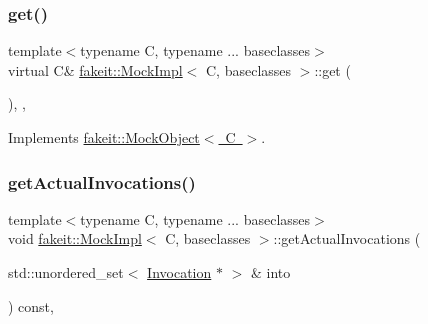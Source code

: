 \mbox{\label{classfakeit_1_1MockImpl_a8f287e857fde9a0941c618ff5459bd88}} 
\subsubsection{\texorpdfstring{get()}{get()}\hspace{0.1cm}{\footnotesize\ttfamily [9/9]}}
{\footnotesize\ttfamily template$<$typename C, typename ... baseclasses$>$ \\
virtual C\& \mbox{\hyperlink{classfakeit_1_1MockImpl}{fakeit\+::\+Mock\+Impl}}$<$ C, baseclasses $>$\+::get (\begin{DoxyParamCaption}{ }\end{DoxyParamCaption})\hspace{0.3cm}{\ttfamily [inline]}, {\ttfamily [override]}, {\ttfamily [virtual]}}



Implements \mbox{\hyperlink{structfakeit_1_1MockObject_a0212799b76097b93a51993cb3af0894a}{fakeit\+::\+Mock\+Object$<$ C $>$}}.

\mbox{\label{classfakeit_1_1MockImpl_a04c3121eb7d380226f1beabf4b18ee82}} 
\subsubsection{\texorpdfstring{getActualInvocations()}{getActualInvocations()}\hspace{0.1cm}{\footnotesize\ttfamily [1/9]}}
{\footnotesize\ttfamily template$<$typename C, typename ... baseclasses$>$ \\
void \mbox{\hyperlink{classfakeit_1_1MockImpl}{fakeit\+::\+Mock\+Impl}}$<$ C, baseclasses $>$\+::get\+Actual\+Invocations (\begin{DoxyParamCaption}\item[{std\+::unordered\+\_\+set$<$ \mbox{\hyperlink{structfakeit_1_1Invocation}{Invocation}} $\ast$ $>$ \&}]{into }\end{DoxyParamCaption}) const\hspace{0.3cm}{\ttfamily [inline]}, {\ttfamily [override]}}




